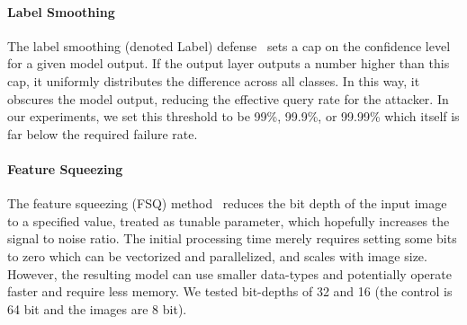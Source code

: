 \documentclass[lettersize,journal]{IEEEtran}
\newcommand{\tl}[1]{\textit{[{\color{red}#1}]}}
\begin{document}







\paragraph{Label Smoothing}
The label smoothing (denoted Label) defense~\cite{label_smoothing} sets a cap on the confidence level for a given model output. If the output layer outputs a number higher than this cap, it uniformly distributes the difference across all classes. In this way, it obscures the model output, reducing the effective query rate for the attacker. In our experiments, we set this threshold to be 99\%,  99.9\%,  or 99.99\% which itself is far below the required failure rate. 



\paragraph{Feature Squeezing}
The feature squeezing (FSQ) method~\cite{feature_squeezing} reduces the bit depth of the input image to a specified value, treated as tunable parameter, which hopefully increases the signal to noise ratio. The initial processing time merely requires setting some bits to zero which can be vectorized and parallelized, and scales with image size. However, the resulting model can use smaller data-types and potentially operate faster and require less memory. We tested bit-depths of 32 and 16 (the control is 64 bit and the images are 8 bit). 
\end{document}
